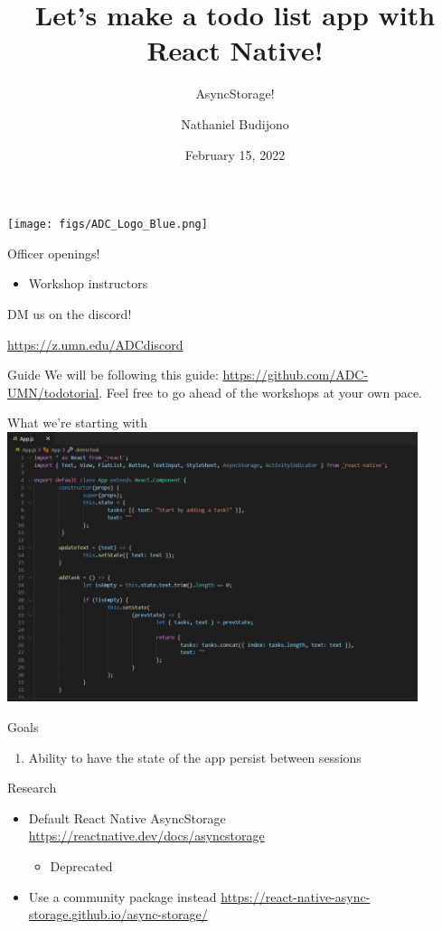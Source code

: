 \documentclass{beamer}
\title{Let's make a todo list app with React Native!}
\subtitle{AsyncStorage!}
\author{Nathaniel Budijono}
\date{February 15, 2022}
\institute{UMN ADC}
\begin{document}
\begin{frame}
    \titlepage
    \texttt{[image: figs/ADC\_Logo\_Blue.png]}
\end{frame}

\begin{frame}{Officer openings!}
	\begin{itemize}
		\item Workshop instructors
	\end{itemize}

	\bigskip

	DM us on the discord!

	\bigskip

	\href{https://z.umn.edu/ADCdiscord}{https://z.umn.edu/ADCdiscord}
\end{frame}

\begin{frame}{Guide}
	We will be following this guide: \href{https://github.com/ADC-UMN/todotorial}{https://github.com/ADC-UMN/todotorial}. Feel free to go ahead of the workshops at your own pace.
\end{frame}

\begin{frame}{What we're starting with}
	\centering
	\includegraphics[width=0.9\textwidth]{figs/after-state.png}	
\end{frame}

\begin{frame}{Goals}
	\begin{enumerate}
		\item Ability to have the state of the app persist between sessions
	\end{enumerate}
\end{frame}

\begin{frame}{Research}
	\begin{itemize}
		\item Default React Native AsyncStorage \href{https://reactnative.dev/docs/asyncstorage}{https://reactnative.dev/docs/asyncstorage} \pause
		\begin{itemize}
			\item Deprecated \pause
		\end{itemize}
		\item Use a community package instead \href{https://react-native-async-storage.github.io/async-storage/}{https://react-native-async-storage.github.io/async-storage/}
	\end{itemize}
\end{frame}
\end{document}
